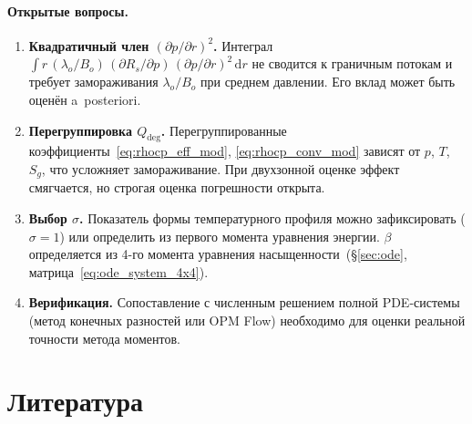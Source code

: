 \documentclass[12pt,a4paper]{article}
\newcommand{\dd}{\mathrm{d}}
\newcommand{\pp}{\partial}
\begin{document}
\paragraph{Открытые вопросы.}
\begin{enumerate}[nosep]
  \item \textbf{Квадратичный член $(\pp p/\pp r)^2$.}
        Интеграл $\int r\,(\lambda_o/B_o)\,(\pp R_s/\pp p)\,
        (\pp p/\pp r)^2\,\dd r$ не сводится к граничным потокам
        и требует замораживания $\lambda_o/B_o$ при среднем давлении.
        Его вклад может быть оценён a~posteriori.

  \item \textbf{Перегруппировка $Q_\mathrm{deg}$.}
        Перегруппированные коэффициенты~\eqref{eq:rhocp_eff_mod},
        \eqref{eq:rhocp_conv_mod} зависят от $p$, $T$, $S_g$,
        что усложняет замораживание. При двухзонной оценке
        эффект смягчается, но строгая оценка погрешности открыта.

  \item \textbf{Выбор $\sigma$.}
        Показатель формы температурного профиля можно зафиксировать
        ($\sigma = 1$) или определить из первого момента уравнения
        энергии. $\beta$ определяется из 4-го момента
        уравнения насыщенности~(§\ref{sec:ode},
        матрица~\eqref{eq:ode_system_4x4}).

  \item \textbf{Верификация.}
        Сопоставление с численным решением полной PDE-системы
        (метод конечных разностей или OPM Flow)
        необходимо для оценки реальной точности метода моментов.
\end{enumerate}


\section*{Литература}
\end{document}
